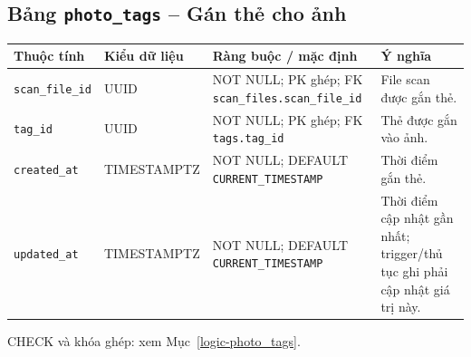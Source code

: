 \subsection{Bảng \texttt{photo\_\allowbreak{}tags} -- Gán thẻ cho ảnh}
\label{dictionary-photo_tags}
\begingroup
\footnotesize
\setlength{\tabcolsep}{3pt}
\begin{longtable}{>{\raggedright\arraybackslash}p{3.1cm}>{\raggedright\arraybackslash}p{2.5cm}>{\raggedright\arraybackslash}p{3.7cm}>{\raggedright\arraybackslash}p{4.3cm}}
\toprule
Thuộc tính & Kiểu dữ liệu & Ràng buộc / mặc định & Ý nghĩa \\
\midrule
\endhead
\texttt{scan\_\allowbreak{}file\_\allowbreak{}id} & UUID & NOT NULL; PK ghép; FK \texttt{scan\_\allowbreak{}files.scan\_\allowbreak{}file\_\allowbreak{}id} & File scan được gắn thẻ. \\
\texttt{tag\_\allowbreak{}id} & UUID & NOT NULL; PK ghép; FK \texttt{tags.tag\_\allowbreak{}id} & Thẻ được gắn vào ảnh. \\
\texttt{created\_\allowbreak{}at} & TIMESTAMPTZ & NOT NULL; DEFAULT \texttt{CURRENT\_\allowbreak{}TIMESTAMP} & Thời điểm gắn thẻ. \\
\texttt{updated\_\allowbreak{}at} & TIMESTAMPTZ & NOT NULL; DEFAULT \texttt{CURRENT\_\allowbreak{}TIMESTAMP} & Thời điểm cập nhật gần nhất; trigger/thủ tục ghi phải cập nhật giá trị này. \\
\bottomrule
\end{longtable}
\endgroup
CHECK và khóa ghép: xem Mục~\ref{logic-photo_tags}.
